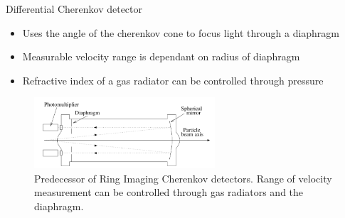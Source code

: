 \documentclass[aspectratio=1610, 10pt]{beamer}
\begin{document}
\begin{frame}{Differential Cherenkov detector}
  \begin{itemize}
    \item Uses the angle of the cherenkov cone to focus light through a diaphragm
    \medskip
    \item Measurable velocity range is dependant on radius of diaphragm
    \medskip
    \item Refractive index of a gas radiator can be controlled through pressure
  \end{itemize}
    \begin{figure}
      \includegraphics[width=0.6\textwidth]{images/differential.png}
      \caption{Predecessor of Ring Imaging Cherenkov detectors. Range of velocity measurement can be controlled through
      gas radiators and the diaphragm.}
    \end{figure}
\end{frame}
\end{document}

